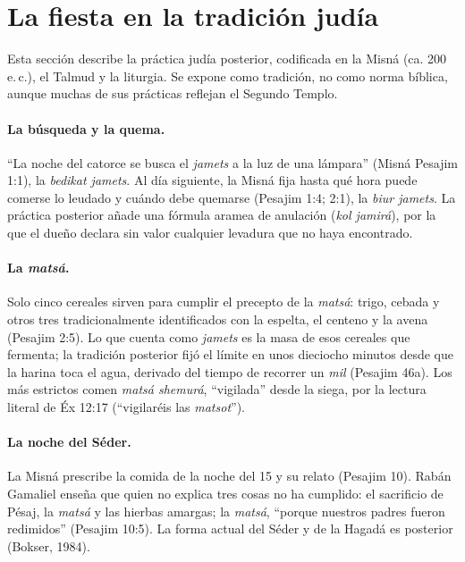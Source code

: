 \documentclass[11pt,letterpaper]{article}
\begin{document}
\section{La fiesta en la tradición judía}\label{sec:tradicion}

\begin{nota}[Precisión]
Esta sección describe la práctica judía posterior, codificada en la Misná (ca. 200 e.\,c.), el Talmud y la liturgia. Se expone como tradición, no como norma bíblica, aunque muchas de sus prácticas reflejan el Segundo Templo.
\end{nota}

\paragraph{La búsqueda y la quema.} ``La noche del catorce se busca el \emph{jamets} a la luz de una lámpara'' (Misná Pesajim 1:1), la \emph{bedikat jamets}. Al día siguiente, la Misná fija hasta qué hora puede comerse lo leudado y cuándo debe quemarse (Pesajim 1:4; 2:1), la \emph{biur jamets}. La práctica posterior añade una fórmula aramea de anulación (\emph{kol jamirá}), por la que el dueño declara sin valor cualquier levadura que no haya encontrado.

\paragraph{La \emph{matsá}.} Solo cinco cereales sirven para cumplir el precepto de la \emph{matsá}: trigo, cebada y otros tres tradicionalmente identificados con la espelta, el centeno y la avena (Pesajim 2:5). Lo que cuenta como \emph{jamets} es la masa de esos cereales que fermenta; la tradición posterior fijó el límite en unos dieciocho minutos desde que la harina toca el agua, derivado del tiempo de recorrer un \emph{mil} (Pesajim 46a). Los más estrictos comen \emph{matsá shemurá}, ``vigilada'' desde la siega, por la lectura literal de Éx 12:17 (``vigilaréis las \emph{matsot}'').

\paragraph{La noche del Séder.} La Misná prescribe la comida de la noche del 15 y su relato (Pesajim 10). Rabán Gamaliel enseña que quien no explica tres cosas no ha cumplido: el sacrificio de Pésaj, la \emph{matsá} y las hierbas amargas; la \emph{matsá}, ``porque nuestros padres fueron redimidos'' (Pesajim 10:5). La forma actual del Séder y de la Hagadá es posterior (Bokser, 1984).
\end{document}

